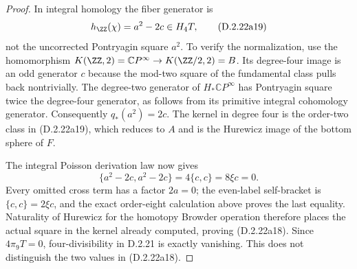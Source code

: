 \begin{proof}
In integral homology the fiber generator is
\[
 h_{\ZZ}(\chi)=a^2-2c\in H_4T,
 \tag{D.2.22a19}
\]
not the uncorrected Pontryagin square $a^2$.
To verify the normalization, use the homomorphism
$K(\ZZ,2)=\mathbb CP^\infty\to K(\ZZ/2,2)=B$.
Its degree-four image is an odd generator $c$ because the
mod-two square of the fundamental class pulls back nontrivially.
The degree-two generator of $H_*\mathbb CP^\infty$ has
Pontryagin square twice the degree-four generator, as follows
from its primitive integral cohomology generator.
Consequently $q_*(a^2)=2c$. The kernel in degree four is
the order-two class in \textup{(D.2.22a19)}, which reduces to
$A$ and is the Hurewicz image of the bottom sphere of $F$.

The integral Poisson derivation law now gives
\[
 \{a^2-2c,a^2-2c\}=4\{c,c\}=8\xi c=0.
 \tag{D.2.22a20}
\]
Every omitted cross term has a factor $2a=0$; the even-label
self-bracket is $\{c,c\}=2\xi c$, and the exact order-eight
calculation above proves the last equality.
Naturality of Hurewicz for the homotopy Browder operation
therefore places the actual square in the kernel already
computed, proving \textup{(D.2.22a18)}. Since $4\pi_9T=0$,
four-divisibility in \textup{D.2.21} is exactly vanishing.
This does not distinguish the two values in
\textup{(D.2.22a18)}.
\end{proof}
